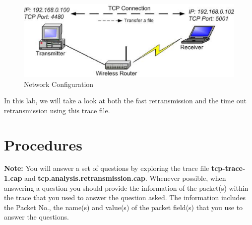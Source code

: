 \begin{figure}[ht]
    \centering
    \includegraphics[width=0.99\columnwidth]{figs/lab_4_network_configuration.eps}
    \caption{Network Configuration}\label{lab_4_fig_config}
\end{figure}

In this lab, we will take a look at both the fast retransmission and
the time out retransmission using this trace file.

\section{Procedures}

{\bf Note:}  You will answer a set of questions by exploring the 
trace file {\bf tcp-trace-1.cap} and {\bf tcp.analysis.retransmission.cap}.
 Whenever possible, when answering a 
question you should provide the information of the packet(s) within 
the trace that you used to answer the question asked. The information 
includes the Packet No., the name(s) and value(s) of the packet field(s) 
that you use to answer the questions.

